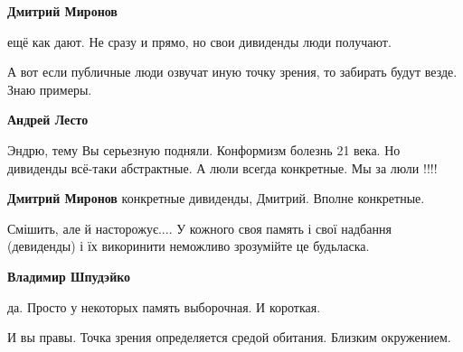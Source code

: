 \begin{itemize}
\begin{itemize}
 
\textbf{Дмитрий Миронов} 

ещё как дают. Не сразу и прямо, но свои дивиденды люди получают.

А вот если публичные люди озвучат иную точку зрения, то забирать будут везде.
Знаю примеры.


 
\textbf{Андрей Лесто} 

Эндрю, тему Вы серьезную подняли. Конформизм болезнь 21 века. Но дивиденды
всё-таки абстрактные. А люли всегда конкретные. Мы за люли !!!!

 
\textbf{Дмитрий Миронов} конкретные дивиденды, Дмитрий. Вполне конкретные.

 
Смішить, але й насторожує.... У кожного своя память і свої надбання (девиденды)
і їх викоринити неможливо зрозумійте це будьласка.


 
\textbf{Владимир Шпудэйко} 

да. Просто у некоторых память выборочная. И короткая.

И вы правы. Точка зрения определяется средой обитания. Близким окружением.


\end{itemize}
\end{itemize}
